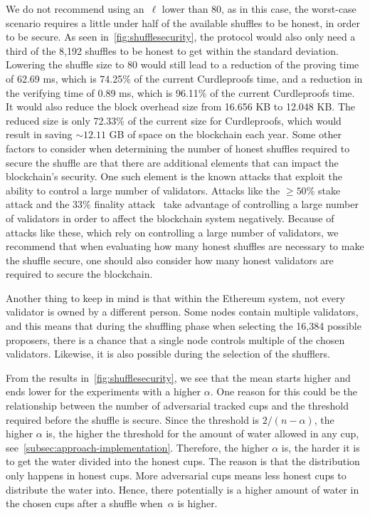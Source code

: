 We do not recommend using an~$\ell$ lower than 80, as in this case, the worst-case scenario requires a little under half of the available shuffles to be honest, in order to be secure.
As seen in~\autoref{fig:shufflesecurity}, the protocol would also only need a third of the 8,192 shuffles to be honest to get within the standard deviation.
Lowering the shuffle size to 80 would still lead to a reduction of the proving time of 62.69 ms, which is 74.25\% of the current Curdleproofs time, and a reduction in the verifying time of 0.89 ms, which is 96.11\% of the current Curdleproofs time.
It would also reduce the block overhead size from 16.656 KB to 12.048 KB\@.
The reduced size is only 72.33\% of the current size for Curdleproofs, which would result in saving $\sim12.11$ GB of space on the blockchain each year.
Some other factors to consider when determining the number of honest shuffles required to secure the shuffle are that there are additional elements that can impact the blockchain's security.
One such element is the known attacks that exploit the ability to control a large number of validators.
Attacks like the $\geq50\%$ stake attack and the $33\%$ finality attack~\cite{EthereumAttackDefense2024} take advantage of controlling a large number of validators in order to affect the blockchain system negatively.
Because of attacks like these, which rely on controlling a large number of validators, we recommend that when evaluating how many honest shuffles are necessary to make the shuffle secure, one should also consider how many honest validators are required to secure the blockchain.

Another thing to keep in mind is that within the Ethereum system, not every validator is owned by a different person.
Some nodes contain multiple validators, and this means that during the shuffling phase when selecting the 16,384 possible proposers, there is a chance that a single node controls multiple of the chosen validators.
Likewise, it is also possible during the selection of the shufflers.

From the results in~\autoref{fig:shufflesecurity}, we see that the mean starts higher and ends lower for the experiments with a higher $\alpha$.
One reason for this could be the relationship between the number of adversarial tracked cups and the threshold required before the shuffle is secure.
Since the threshold is $2/(n-\alpha)$, the higher $\alpha$ is, the higher the threshold for the amount of water allowed in any cup, see~\autoref{subsec:approach-implementation}.
Therefore, the higher $\alpha$ is, the harder it is to get the water divided into the honest cups.
The reason is that the distribution only happens in honest cups.
More adversarial cups means less honest cups to distribute the water into.
Hence, there potentially is a higher amount of water in the chosen cups after a shuffle when~$\alpha$ is higher.
